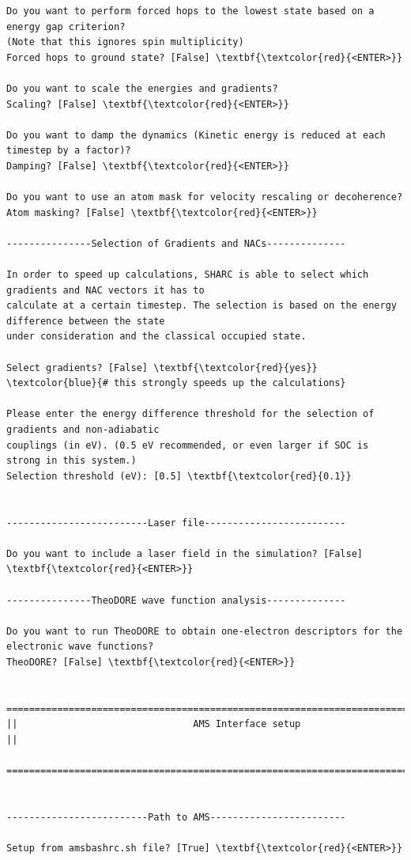 \documentclass[a4paper,11pt,DIV=15,openany]{scrbook}
\begin{document}
\begin{oframed}
\begin{Verbatim}[commandchars=\\\{\}]
Do you want to perform forced hops to the lowest state based on a energy gap criterion?
(Note that this ignores spin multiplicity)
Forced hops to ground state? [False] \textbf{\textcolor{red}{<ENTER>}}

Do you want to scale the energies and gradients?
Scaling? [False] \textbf{\textcolor{red}{<ENTER>}}

Do you want to damp the dynamics (Kinetic energy is reduced at each timestep by a factor)?
Damping? [False] \textbf{\textcolor{red}{<ENTER>}}

Do you want to use an atom mask for velocity rescaling or decoherence?
Atom masking? [False] \textbf{\textcolor{red}{<ENTER>}}

---------------Selection of Gradients and NACs--------------

In order to speed up calculations, SHARC is able to select which gradients and NAC vectors it has to 
calculate at a certain timestep. The selection is based on the energy difference between the state 
under consideration and the classical occupied state.

Select gradients? [False] \textbf{\textcolor{red}{yes}}    \textcolor{blue}{# this strongly speeds up the calculations}

Please enter the energy difference threshold for the selection of gradients and non-adiabatic 
couplings (in eV). (0.5 eV recommended, or even larger if SOC is strong in this system.)
Selection threshold (eV): [0.5] \textbf{\textcolor{red}{0.1}}


-------------------------Laser file-------------------------

Do you want to include a laser field in the simulation? [False] \textbf{\textcolor{red}{<ENTER>}}

---------------TheoDORE wave function analysis--------------

Do you want to run TheoDORE to obtain one-electron descriptors for the electronic wave functions?
TheoDORE? [False] \textbf{\textcolor{red}{<ENTER>}} 

  ================================================================================
||                               AMS Interface setup                              ||
  ================================================================================


-------------------------Path to AMS------------------------

Setup from amsbashrc.sh file? [True] \textbf{\textcolor{red}{<ENTER>}}


\end{Verbatim}
\end{oframed}
\end{document}
